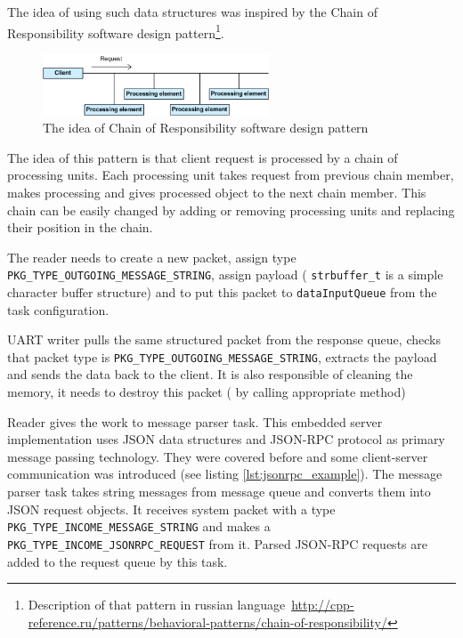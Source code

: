 The idea of using such data structures was inspired by the Chain of Responsibility software design pattern\footnote{Description of that pattern in russian language~\url{http://cpp-reference.ru/patterns/behavioral-patterns/chain-of-responsibility/} }.
\begin{center}
 \begin{figure}[H]
 	\centering
	\includegraphics[width=0.6\textwidth]{../images/implementation/embedded_server/demo-chain-of-responsibility-1.png}
	\caption{The idea of  Chain of Responsibility software design pattern}
	\label{fig:chain_of_responsibility}
 \end{figure}
\end{center}
The idea of this pattern is that client request is processed by a chain of processing units.
Each processing unit takes request from previous chain member, makes processing and gives processed object to the next chain member.
This chain can be easily changed by adding or removing processing units and replacing their position in the chain.

The reader needs to create a new packet, assign type
\texttt{PKG\_TYPE\_OUTGOING\_MESSAGE\_STRING}, assign payload (
\texttt{strbuffer\_t} is a simple character buffer structure) and to put this
packet to \texttt{dataInputQueue} from the task configuration.

UART writer pulls the same structured packet from the response queue, checks
that packet type is \texttt{PKG\_TYPE\_OUTGOING\_MESSAGE\_STRING}, extracts the
payload and sends the data back to the client. It is also responsible of
cleaning the memory, it needs to destroy this packet ( by calling appropriate
method)

Reader gives the work to message parser task.
This embedded server implementation uses 
JSON data structures and JSON-RPC protocol  as primary  message passing technology.
They were covered before and some client-server communication was introduced (see listing \ref{lst:jsonrpc_example}). 
The message parser task takes string messages from message queue and converts them into JSON request objects. 
It receives system packet with a type \texttt{PKG\_TYPE\_INCOME\_MESSAGE\_STRING} and makes a \texttt{PKG\_TYPE\_INCOME\_JSONRPC\_REQUEST}  from it.
Parsed JSON-RPC requests are added to the request queue by this task.

